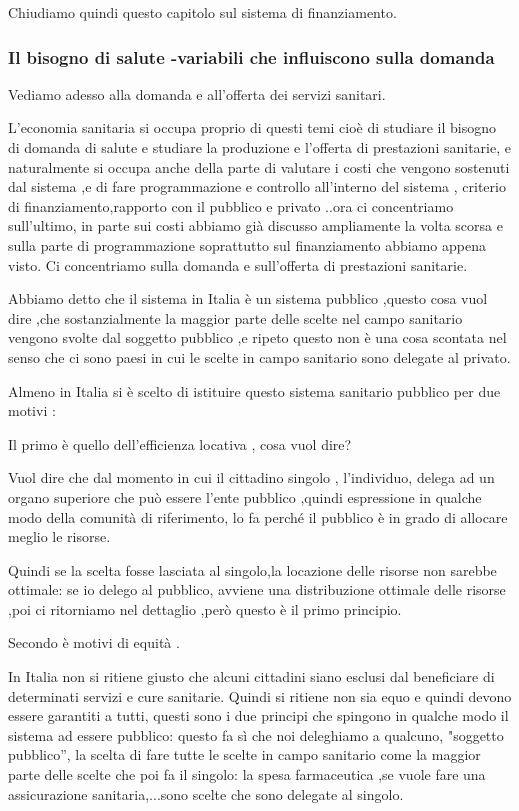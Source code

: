 Chiudiamo quindi questo capitolo sul sistema di finanziamento.

\subsubsection{Il bisogno di salute -variabili che influiscono sulla domanda}

Vediamo adesso alla domanda e all'offerta dei servizi sanitari.

L'economia sanitaria si occupa proprio di questi temi cioè di studiare
il bisogno di domanda di salute e studiare la produzione e l'offerta di
prestazioni sanitarie, e naturalmente si occupa anche della parte di
valutare i costi che vengono sostenuti dal sistema ,e di fare
programmazione e controllo all'interno del sistema , criterio di
finanziamento,rapporto con il pubblico e privato ..ora ci concentriamo
sull'ultimo, in parte sui costi abbiamo già discusso ampliamente la
volta scorsa e sulla parte di programmazione soprattutto sul
finanziamento abbiamo appena visto. Ci concentriamo sulla domanda e
sull'offerta di prestazioni sanitarie.

Abbiamo detto che il sistema in Italia è un sistema pubblico ,questo
cosa vuol dire ,che sostanzialmente la maggior parte delle scelte nel
campo sanitario vengono svolte dal soggetto pubblico ,e ripeto questo
non è una cosa scontata nel senso che ci sono paesi in cui le scelte in
campo sanitario sono delegate al privato.

Almeno in Italia si è scelto di istituire questo sistema sanitario
pubblico per due motivi :

Il primo è quello dell'efficienza locativa , cosa vuol dire?

Vuol dire che dal momento in cui il cittadino singolo , l'individuo,
delega ad un organo superiore che può essere l'ente pubblico ,quindi
espressione in qualche modo della comunità di riferimento, lo fa perché
il pubblico è in grado di allocare meglio le risorse.

Quindi se la scelta fosse lasciata al singolo,la locazione delle risorse
non sarebbe ottimale: se io delego al pubblico, avviene una
distribuzione ottimale delle risorse ,poi ci ritorniamo nel dettaglio
,però questo è il primo principio.

Secondo è motivi di equità .

In Italia non si ritiene giusto che alcuni cittadini siano esclusi dal
beneficiare di determinati servizi e cure sanitarie. Quindi si ritiene
non sia equo e quindi devono essere garantiti a tutti, questi sono i due
principi che spingono in qualche modo il sistema ad essere pubblico:
questo fa sì che noi deleghiamo a qualcuno, "soggetto pubblico'', la
scelta di fare tutte le scelte in campo sanitario come la maggior parte
delle scelte che poi fa il singolo: la spesa farmaceutica ,se vuole fare
una assicurazione sanitaria,...sono scelte che sono delegate al singolo.

